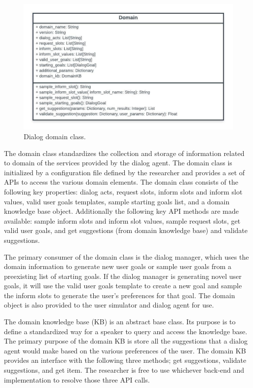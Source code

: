 \begin{figure}[h!]
	\centering
	\includegraphics[scale=.9]{diagrams/domain_class.jpeg}
	\caption{ Dialog domain class. }
	\label{fig:domain_class}
\end{figure}

The domain class standardizes the collection and storage of information related to domain of the services provided by the dialog agent. The domain class is initialized by a configuration file defined by the researcher and provides a set of APIs to access the various domain elements. The domain class consists of the following key properties: dialog acts, request slots, inform slots and inform slot values, valid user goals templates, sample starting goals list, and a domain knowledge base object.  Additionally the following key API methods are made available: sample inform slots and inform slot values, sample request slots, get valid user goals, and get suggestions (from domain knowledge base) and validate suggestions. 

The primary consumer of the domain class is the dialog manager, which uses the domain information to generate new user goals or sample user goals from a preexisting list of starting goals. If the dialog manager is generating novel user goals, it will use the valid user goals template to create a new goal and sample the inform slots to generate the user's preferences for that goal. The domain object is also provided to the user simulator and dialog agent for use. 

The domain knowledge base (KB) is an abstract base class. Its purpose is to define a standardized way for a speaker to query and access the knowledge base. The primary purpose of the domain KB is store all the suggestions that a dialog agent would make based on the various preferences of the user. The domain KB provides an interface with the following three methods; get suggestions, validate suggestions, and get item. The researcher is free to use whichever back-end and implementation to resolve those three API calls. 

